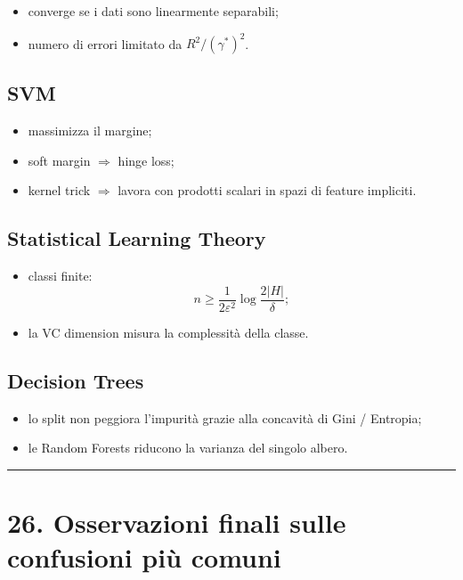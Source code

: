 \documentclass{article}
\providecommand{\tightlist}{%
  \setlength{\itemsep}{0pt}\setlength{\parskip}{0pt}}
\begin{document}
\begin{itemize}
\tightlist
\item
  converge se i dati sono linearmente separabili;
\item
  numero di errori limitato da \(R^2/(\gamma^*)^2\).
\end{itemize}

\subsection{SVM}\label{svm}

\begin{itemize}
\tightlist
\item
  massimizza il margine;
\item
  soft margin \(\Rightarrow\) hinge loss;
\item
  kernel trick \(\Rightarrow\) lavora con prodotti scalari in spazi di
  feature impliciti.
\end{itemize}

\subsection{Statistical Learning
Theory}\label{statistical-learning-theory}

\begin{itemize}
\tightlist
\item
  classi finite: \[
  n \ge \frac{1}{2\varepsilon^2}\log\frac{2|H|}{\delta};
  \]
\item
  la VC dimension misura la complessità della classe.
\end{itemize}

\subsection{Decision Trees}\label{decision-trees}

\begin{itemize}
\tightlist
\item
  lo split non peggiora l'impurità grazie alla concavità di Gini /
  Entropia;
\item
  le Random Forests riducono la varianza del singolo albero.
\end{itemize}

\begin{center}\rule{0.5\linewidth}{0.5pt}\end{center}

\section{26. Osservazioni finali sulle confusioni più
comuni}\label{osservazioni-finali-sulle-confusioni-piuxf9-comuni}
\end{document}
